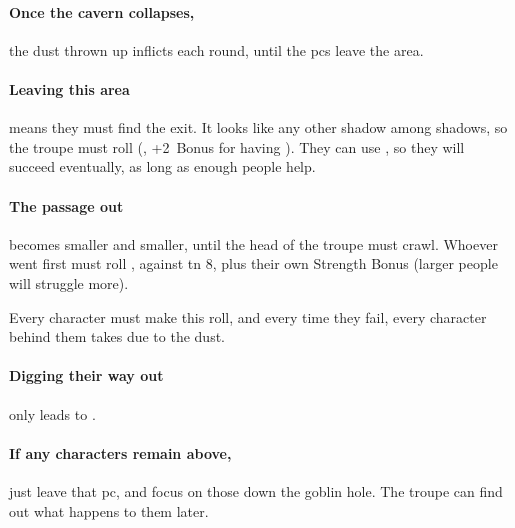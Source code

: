 \begin{multicols}{2}

\paragraph{Once the cavern collapses,}
the dust thrown up inflicts  each \gls{round}, until the \glspl{pc} leave the \gls{area}.

\paragraph{Leaving this area}
means they must find the exit.
It looks like any other shadow among shadows, so the troupe must roll  (\tn[10], +2~Bonus for having ).
They can use , so they will succeed eventually, as long as enough people help.

\paragraph{The passage out}
becomes smaller and smaller, until the head of the troupe must crawl.
Whoever went first must roll , against \gls{tn} 8, plus their own Strength Bonus (larger people will struggle more).

Every character must make this roll, and every time they fail, every character behind them takes  due to the dust.

\paragraph{Digging their way out}
only leads to .

\paragraph{If any characters remain above,}
just leave that \gls{pc}, and focus on those down the goblin hole.
The troupe can find out what happens to them later.

\end{multicols}

